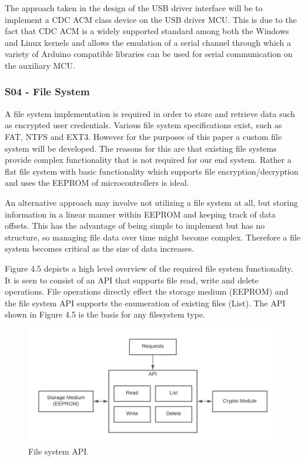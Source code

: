 The approach taken in the design of the USB driver interface will be to implement a CDC ACM class device on the USB driver MCU. This is due to the fact that CDC ACM is a widely supported standard among both the Windows and Linux kernels and allows the emulation of a serial channel through which a variety of Arduino compatible libraries can be used for serial communication on the auxiliary MCU. 

\subsubsection{S04 - File System}
A file system implementation is required in order to store and retrieve data such as encrypted user credentials. Various file system specifications exist, such as FAT, NTFS and EXT3. However for the purposes of this paper a custom file system will be developed. The reasons for this are that existing file systems provide complex functionality that is not required for our end system. Rather a flat file system with basic functionality which supports file encryption/decryption and uses the EEPROM of microcontrollers is ideal.

An alternative approach may involve not utilizing a file system at all, but storing information in a linear manner within EEPROM and keeping track of data offsets. This has the advantage of being simple to implement but has no structure, so managing file data over time might become complex. Therefore a file system becomes critical as the size of data increases.

Figure 4.5 depicts a high level overview of the required file system functionality. It is seen to consist of an API that supports file read, write and delete operations. File operations directly effect the storage medium (EEPROM) and the file system API supports the enumeration of existing files (List). The API shown in Figure 4.5 is the basis for any filesystem type.

\begin{figure}[H]
\centering
\includegraphics[width=0.8\columnwidth]{Figures/Fig_20.png}
\caption{File system API.}
\label{fig:gantt}
\end{figure}
